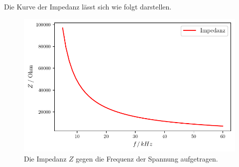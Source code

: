     Die Kurve der Impedanz lässt sich wie folgt darstellen.

    \begin{figure}
      \centering
      \includegraphics{build/plotZ.pdf}
      \caption{Die Impedanz $Z$ gegen die Frequenz der Spannung aufgetragen.}
      \label{fig:plotZ}
    \end{figure}